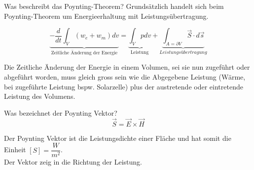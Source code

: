 
\begin{karte}{Was beschreibt das Poynting-Theorem?}
	Grundsätzlich handelt sich beim Poynting-Theorem um Energieerhaltung mit Leistungsübertragung.
	
	\begin{equation*}
	\underbrace{-\frac{d}{d t} \int_{V}\left(w_{e}+w_{m}\right) d v}_{\text{ Zeitliche Änderung der Energie }}
	=
	\underbrace{\int_{V} p d v}_{\text{Leistung}}
	+
	\underbrace{\int_{A=\partial V} \vec{S} \cdot d \vec{s}}_{Leistungsübertragung}
	\end{equation*}
	
	Die Zeitliche Änderung der Energie in einem Volumen, sei sie nun zugeführt oder abgeführt worden, muss gleich gross sein wie die Abgegebene Leistung (Wärme, bei zugeführte Leistung bspw. Solarzelle) plus der austretende oder eintretende Leistung des Volumens.
\end{karte}

\begin{karte}{Was bezeichnet der Poynting Vektor?}
	\begin{equation*}
	\vec{S}=\vec{E} \times \vec{H}
	\end{equation*}
	
	Der Poynting Vektor ist die Leistungsdichte einer Fläche und hat somit die Einheit $[S] = \dfrac{W}{m^2}$.\\
	Der Vektor zeig in die Richtung der Leistung.\\[5pt]
\end{karte}